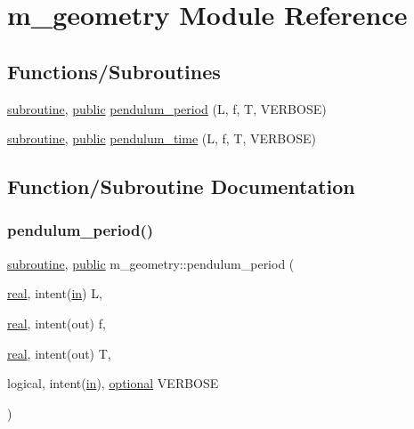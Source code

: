\hypertarget{namespacem__geometry}{}\section{m\+\_\+geometry Module Reference}
\label{namespacem__geometry}
\subsection*{Functions/\+Subroutines}
\begin{DoxyCompactItemize}
\item 
\hyperlink{M__stopwatch_83_8txt_acfbcff50169d691ff02d4a123ed70482}{subroutine}, \hyperlink{M__stopwatch_83_8txt_a2f74811300c361e53b430611a7d1769f}{public} \hyperlink{namespacem__geometry_a9a2c835814bcdf733a2bfc1d84f4f6a7}{pendulum\+\_\+period} (L, f, T, V\+E\+R\+B\+O\+SE)
\item 
\hyperlink{M__stopwatch_83_8txt_acfbcff50169d691ff02d4a123ed70482}{subroutine}, \hyperlink{M__stopwatch_83_8txt_a2f74811300c361e53b430611a7d1769f}{public} \hyperlink{namespacem__geometry_aa15fe1bd2e07252679a3516d936b290f}{pendulum\+\_\+time} (L, f, T, V\+E\+R\+B\+O\+SE)
\end{DoxyCompactItemize}


\subsection{Function/\+Subroutine Documentation}
\mbox{\label{namespacem__geometry_a9a2c835814bcdf733a2bfc1d84f4f6a7}} 
\subsubsection{\texorpdfstring{pendulum\+\_\+period()}{pendulum\_period()}}
{\footnotesize\ttfamily \hyperlink{M__stopwatch_83_8txt_acfbcff50169d691ff02d4a123ed70482}{subroutine}, \hyperlink{M__stopwatch_83_8txt_a2f74811300c361e53b430611a7d1769f}{public} m\+\_\+geometry\+::pendulum\+\_\+period (\begin{DoxyParamCaption}\item[{\hyperlink{read__watch_83_8txt_abdb62bde002f38ef75f810d3a905a823}{real}, intent(\hyperlink{M__journal_83_8txt_afce72651d1eed785a2132bee863b2f38}{in})}]{L,  }\item[{\hyperlink{read__watch_83_8txt_abdb62bde002f38ef75f810d3a905a823}{real}, intent(out)}]{f,  }\item[{\hyperlink{read__watch_83_8txt_abdb62bde002f38ef75f810d3a905a823}{real}, intent(out)}]{T,  }\item[{logical, intent(\hyperlink{M__journal_83_8txt_afce72651d1eed785a2132bee863b2f38}{in}), \hyperlink{option__stopwatch_83_8txt_aa4ece75e7acf58a4843f70fe18c3ade5}{optional}}]{V\+E\+R\+B\+O\+SE }\end{DoxyParamCaption})}

